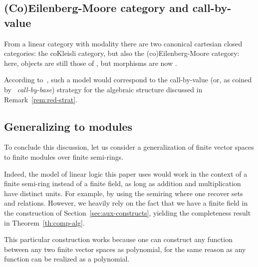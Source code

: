 \documentclass[10pt]{article}
\theoremstyle{plain}
\theoremstyle{definition}
\begin{document}
\subsection{(Co)Eilenberg-Moore category and call-by-value}
\label{sec:call-value-reduction}


From a linear category with modality  there are two canonical cartesian
closed categories: the coKleisli category, but also the (co)Eilenberg-Moore
category: here, objects are still those of , but morphisms
are now .

According to~\cite{valiron13typed}, such a model would correspond to
the call-by-value (or, as coined by~\cite{diazcaro-phd} {\em call-by-base})
strategy for the algebraic structure discussed in
Remark~\ref{rem:red-strat}.


\subsection{Generalizing to modules}
\label{sec:generalizing-modules}

To conclude this discussion, let us consider a generalization of finite vector
spaces to finite modules over finite semi-rings.

Indeed, the model of linear logic this paper uses would work in the context of a
finite semi-ring instead of a finite field, as long as addition and
multiplication have distinct units. For example, by using the
semiring  where  one recover sets and relations.
However, we heavily rely on the fact
that we have a finite field  in the construction of
Section~\ref{sec:aux-constructs}, yielding the completeness result in
Theorem~\ref{th:comp-alg}.

This particular construction works because one can construct any
function between any two finite vector spaces as polynomial, for the
same reason as any function  can be realized as a polynomial.
\end{document}
